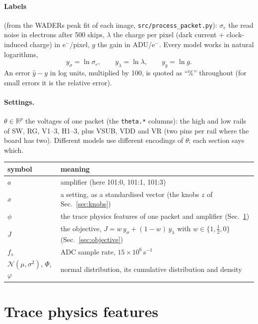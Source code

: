 \documentclass[10pt,a4paper]{article}
\newcommand{\code}[1]{\texttt{\small #1}}
\begin{document}
\paragraph{Labels} (from the WADERs peak fit of each image, \code{src/process\_packet.py}):
$\sigma_e$ the read noise in electrons after 500 skips, $\lambda$ the charge per pixel (dark current + clock-induced charge)
in e$^-$/pixel, $g$ the gain in ADU/e$^-$. Every model works in natural logarithms,
\begin{equation}
y_\sigma=\ln\sigma_e,\qquad y_\lambda=\ln\lambda,\qquad y_g=\ln g .
\end{equation}
An error $\hat y-y$ in log units, multiplied by 100, is quoted as ``\%'' throughout (for small errors it is the relative error).

\paragraph{Settings.} $\theta\in\mathbb R^{p}$ the voltages of one packet (the \code{theta.*} columns): the
high and low rails of SW, RG, V1--3, H1--3, plus VSUB, VDD and VR (two pins per rail where the board has two).
Different models use different encodings of $\theta$; each section says which.

\begin{center}\small
\begin{tabularx}{\linewidth}{@{}lX@{}}\toprule
symbol & meaning\\\midrule
$a$ & amplifier (here 101:0, 101:1, 101:3)\\
$x$ & a setting, as a standardised vector (the knobs $z$ of Sec.~\ref{sec:knobs})\\
$\phi$ & the trace physics features of one packet and amplifier (Sec.~\ref{sec:features})\\
$J$ & the objective, $J=w\,y_\sigma+(1-w)\,y_\lambda$ with $w\in\{1,\tfrac12,0\}$ (Sec.~\ref{sec:objective})\\
$f_s$ & ADC sample rate, $15\times10^6$\,s$^{-1}$\\
$\mathcal N(\mu,\sigma^2)$, $\Phi$, $\varphi$ & normal distribution, its cumulative distribution and density\\\bottomrule
\end{tabularx}
\end{center}

\section{Trace physics features}\label{sec:features}
\end{document}
